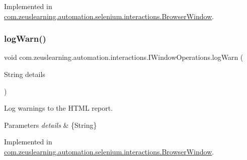 Implemented in \hyperlink{classcom_1_1zeuslearning_1_1automation_1_1selenium_1_1interactions_1_1BrowserWindow_a39c9a28e17c925a56f2948dee5b9d00e}{com.\+zeuslearning.\+automation.\+selenium.\+interactions.\+Browser\+Window}.

\hypertarget{interfacecom_1_1zeuslearning_1_1automation_1_1interactions_1_1IWindowOperations_a8cb651e4ad3d55ef3ce0eeef34680a5a}{}\label{interfacecom_1_1zeuslearning_1_1automation_1_1interactions_1_1IWindowOperations_a8cb651e4ad3d55ef3ce0eeef34680a5a} 
\subsubsection{\texorpdfstring{log\+Warn()}{logWarn()}}
{\footnotesize\ttfamily void com.\+zeuslearning.\+automation.\+interactions.\+I\+Window\+Operations.\+log\+Warn (\begin{DoxyParamCaption}\item[{String}]{details }\end{DoxyParamCaption})}

Log warnings to the H\+T\+ML report.


\begin{DoxyParams}{Parameters}
{\em details} & \{String\} \\
\hline
\end{DoxyParams}


Implemented in \hyperlink{classcom_1_1zeuslearning_1_1automation_1_1selenium_1_1interactions_1_1BrowserWindow_ac1a4682b2ae296ccc8ce7c10bf0f48d0}{com.\+zeuslearning.\+automation.\+selenium.\+interactions.\+Browser\+Window}.

\hypertarget{interfacecom_1_1zeuslearning_1_1automation_1_1interactions_1_1IWindowOperations_aafa2eefdac53d368d85e626d7d7901ea}{}\label{interfacecom_1_1zeuslearning_1_1automation_1_1interactions_1_1IWindowOperations_aafa2eefdac53d368d85e626d7d7901ea} 
